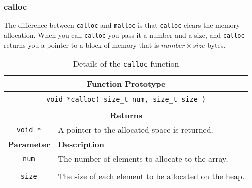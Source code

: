 \clearpage
\subsubsection{calloc} %
\label{ssub:calloc}

The difference between \texttt{calloc} and \texttt{malloc} is that \texttt{calloc} clears the memory allocation. When you call \texttt{calloc} you pass it a number and a size, and \texttt{calloc} returns you a pointer to a block of memory that is $number \times size$ bytes.

\begin{table}[h]
  \centering
  \begin{tabular}{|c|p{9.5cm}|}
    \hline
    \multicolumn{2}{|c|}{\textbf{Function Prototype}} \\
    \hline
    \multicolumn{2}{|c|}{} \\
    \multicolumn{2}{|c|}{\texttt{void *calloc( size\_t num, size\_t size )}} \\
    \multicolumn{2}{|c|}{} \\
    \hline
    \multicolumn{2}{|c|}{\textbf{Returns}} \\
    \hline
    \texttt{void *} & A pointer to the allocated space is returned. \\
    \hline
    \textbf{Parameter} & \textbf{Description} \\
    \hline
    \texttt{ num } & The number of elements to allocate to the array.\\
    & \\
    \texttt{ size } & The size of each element to be allocated on the heap. \\
    \hline
  \end{tabular}
  \caption{Details of the \texttt{calloc} function}
  \label{tbl:calloc}
\end{table}




